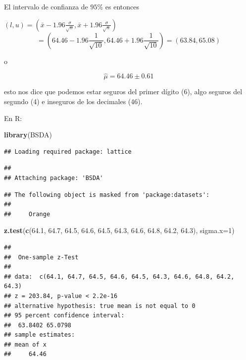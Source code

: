 \documentclass[
]{book}
\newenvironment{Shaded}{\begin{snugshade}}{\end{snugshade}}
\newcommand{\AttributeTok}[1]{\textcolor[rgb]{0.13,0.29,0.53}{#1}}
\newcommand{\DecValTok}[1]{\textcolor[rgb]{0.00,0.00,0.81}{#1}}
\newcommand{\FloatTok}[1]{\textcolor[rgb]{0.00,0.00,0.81}{#1}}
\newcommand{\FunctionTok}[1]{\textcolor[rgb]{0.13,0.29,0.53}{\textbf{#1}}}
\newcommand{\NormalTok}[1]{#1}
\begin{document}
El intervalo de confianza de \(95\%\) es entonces

\((l,u)=(\bar{x}-1.96 \frac{\sigma}{\sqrt{n}}, \bar{x}+1.96 \frac{\sigma}{\sqrt{n}})\)
\[=(64.46-1.96 \frac{1}{\sqrt{10}}, 64.46+1.96 \frac{1}{\sqrt{10}})=(63.84,65.08)\]

o

\[\hat{\mu}=64.46 \pm 0.61\]

esto nos dice que podemos estar seguros del primer dígito (6), algo seguros del segundo (4) e inseguros de los decimales (46).

En R:

\begin{Shaded}
\begin{Highlighting}[]
\FunctionTok{library}\NormalTok{(BSDA) }
\end{Highlighting}
\end{Shaded}

\begin{verbatim}
## Loading required package: lattice
\end{verbatim}

\begin{verbatim}
## 
## Attaching package: 'BSDA'
\end{verbatim}

\begin{verbatim}
## The following object is masked from 'package:datasets':
## 
##     Orange
\end{verbatim}

\begin{Shaded}
\begin{Highlighting}[]
\FunctionTok{z.test}\NormalTok{(}\FunctionTok{c}\NormalTok{(}\FloatTok{64.1}\NormalTok{, }\FloatTok{64.7}\NormalTok{, }\FloatTok{64.5}\NormalTok{, }\FloatTok{64.6}\NormalTok{, }\FloatTok{64.5}\NormalTok{, }\FloatTok{64.3}\NormalTok{, }\FloatTok{64.6}\NormalTok{, }\FloatTok{64.8}\NormalTok{, }\FloatTok{64.2}\NormalTok{, }\FloatTok{64.3}\NormalTok{), }
       \AttributeTok{sigma.x=}\DecValTok{1}\NormalTok{)}
\end{Highlighting}
\end{Shaded}

\begin{verbatim}
## 
##  One-sample z-Test
## 
## data:  c(64.1, 64.7, 64.5, 64.6, 64.5, 64.3, 64.6, 64.8, 64.2, 64.3)
## z = 203.84, p-value < 2.2e-16
## alternative hypothesis: true mean is not equal to 0
## 95 percent confidence interval:
##  63.8402 65.0798
## sample estimates:
## mean of x 
##     64.46
\end{verbatim}
\end{document}
